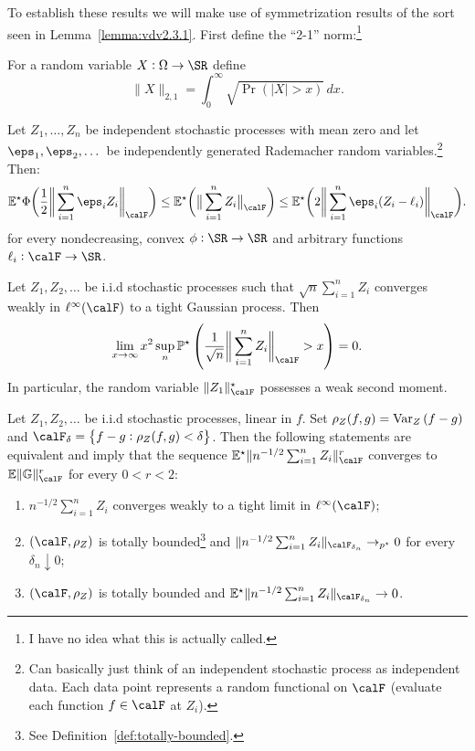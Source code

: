 To establish these results we will make use of symmetrization results of the sort seen in Lemma~\ref{lemma:vdv2.3.1}. First define the ``2-1'' norm:\footnote{I have no idea what this is actually called.}
\begin{definition}[2-1 Norm]
	\label{def:21norm}
	For a random variable \(X:\Omega\to\SR\) define
	\[
		\|X\|_{2,1}=\int_{0}^{\infty} \sqrt{\Pr\left(|X|>x\right)}\,dx 
	.\] 
\end{definition}
\begin{lemma}
	\label{lemma:generalized-symmetrization}
	Let \(Z_1,\dots,Z_n\) be independent stochastic processes with mean zero and let \(\eps_1,\eps_2,\dots\) be independently generated Rademacher random variables.\footnote{Can basically just think of an independent stochastic process as independent data. Each data point represents a random functional on \(\calF\) (evaluate each function \(f\in\calF\) at \(Z_i\)).} Then:
	\[
	    \E^\star\Phi\bigg(\frac{1}{2}\bigg\|\sum_{i=1}^n \eps_iZ_i\bigg\|_\calF\bigg)
		\leq \E^\star\bigg(\big\|\sum_{i=1}^n Z_i\big\|_\calF\bigg)
		\leq \E^\star\bigg(2\bigg\|\sum_{i=1}^n \eps_i(Z_i-\ell_i)\bigg\|_\calF\bigg)
	.\]
	for every nondecreasing, convex \(\phi:\SR\to\SR\) and arbitrary functions \(\ell_i:\calF\to\SR\).
\end{lemma}
\begin{lemma}
	\label{lemma:donsker-implication}
	Let \(Z_1,Z_2,\dots\) be i.i.d stochastic processes such that \(\sqrt{n}\sum_{i=1}^n Z_i\) converges weakly in \(\ell^\infty(\calF)\) to a tight Gaussian process. Then
	\[
		\lim_{x\to\infty}x^2\sup_n \P^\star\left(\frac{1}{\sqrt{n}}\bigg\|\sum_{i=1}^n Z_i\bigg\|_\calF > x\right) = 0
	.\] 
	In particular, the random variable \(\|Z_1\|^\star_\calF\) possesses a weak second moment.
\end{lemma}
\begin{lemma}
	\label{lemma:convergence-characterizations}
	Let \(Z_1,Z_2,\dots\) be i.i.d stochastic processes, linear in \(f\). Set \(\rho_Z(f,g) = \operatorname{Var}_Z\left(f-g\right)\) and \(\calF_\delta = \left\{f-g:\rho_Z(f,g)<\delta\right\}\). Then the following statements are equivalent and imply that the sequence \(\E^\star\|n^{-1/2}\sum_{i=1}^n Z_i\|_\calF^r\) converges to \(\E\|\mathbb{G}\|_\calF^r\) for every \(0<r<2\):
	\begin{enumerate}
		\item \(n^{-1/2}\sum_{i=1}^n Z_i\) converges weakly to a tight limit in \(\ell^\infty(\calF)\);
		\item \((\calF,\rho_Z)\) is totally bounded\footnote{See Definition~\ref{def:totally-bounded}.} and \(\|n^{-1/2}\sum_{i=1}^n Z_i\|_{\calF_{\delta_n}}\to_{p^\star}0\) for every \(\delta_n\downarrow 0\);
		\item \((\calF,\rho_Z)\) is totally bounded and \(\E^\star\|n^{-1/2}\sum_{i=1}^n Z_i\|_{\calF_{\delta_n}}\to0\).
	\end{enumerate}
\end{lemma}
